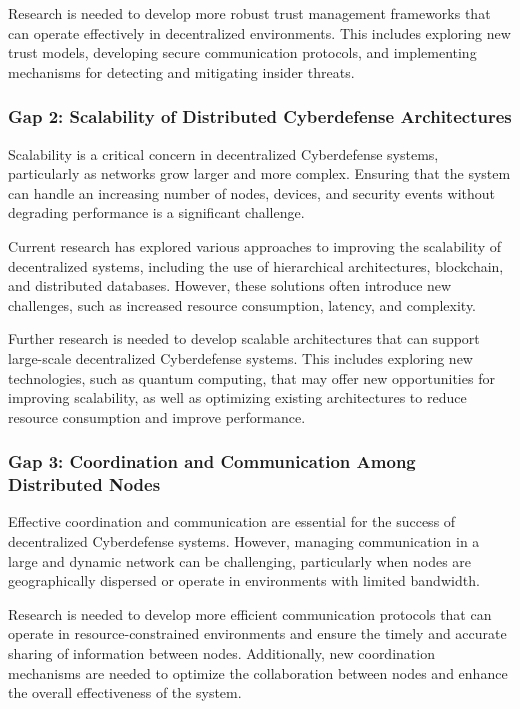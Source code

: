 Research is needed to develop more robust trust management frameworks that can operate effectively in decentralized environments. This includes exploring new trust models, developing secure communication protocols, and implementing mechanisms for detecting and mitigating insider threats.

\subsubsection{Gap 2: Scalability of Distributed Cyberdefense Architectures}

Scalability is a critical concern in decentralized Cyberdefense systems, particularly as networks grow larger and more complex. Ensuring that the system can handle an increasing number of nodes, devices, and security events without degrading performance is a significant challenge.

Current research has explored various approaches to improving the scalability of decentralized systems, including the use of hierarchical architectures, blockchain, and distributed databases. However, these solutions often introduce new challenges, such as increased resource consumption, latency, and complexity.

Further research is needed to develop scalable architectures that can support large-scale decentralized Cyberdefense systems. This includes exploring new technologies, such as quantum computing, that may offer new opportunities for improving scalability, as well as optimizing existing architectures to reduce resource consumption and improve performance.

\subsubsection{Gap 3: Coordination and Communication Among Distributed Nodes}

Effective coordination and communication are essential for the success of decentralized Cyberdefense systems. However, managing communication in a large and dynamic network can be challenging, particularly when nodes are geographically dispersed or operate in environments with limited bandwidth.

Research is needed to develop more efficient communication protocols that can operate in resource-constrained environments and ensure the timely and accurate sharing of information between nodes. Additionally, new coordination mechanisms are needed to optimize the collaboration between nodes and enhance the overall effectiveness of the system.

